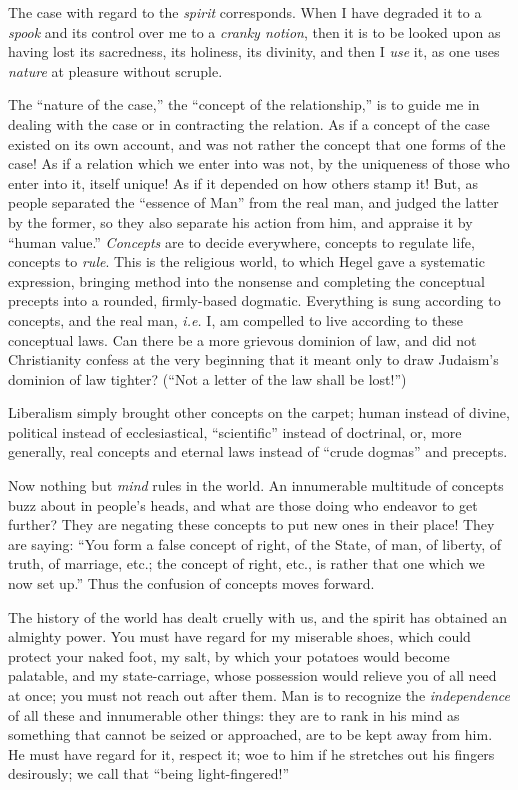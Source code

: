 \documentclass[12pt,a4paper]{book}
\begin{document}
The case with regard to the \textit{spirit} corresponds. When I have degraded 
it to a \textit{spook} and its control over me to a \textit{cranky notion}, 
then it is to be looked upon as having lost its sacredness, its holiness, its 
divinity, and then I \textit{use} it, as one uses \textit{nature} at pleasure 
without scruple.

The ``nature of the case,'' the ``concept of the relationship,'' is to 
guide me in dealing with the case or in contracting the relation. As if a 
concept of the case existed on its own account, and was not rather the concept 
that one forms of the case! As if a relation which we enter into was not, by 
the uniqueness of those who enter into it, itself unique! As if it depended on 
how others stamp it! But, as people separated the ``essence of Man'' from 
the real man, and judged the latter by the former, so they also separate his 
action from him, and appraise it by ``human value.'' \textit{Concepts} are 
to decide everywhere, concepts to regulate life, concepts to \textit{rule}. 
This is the religious world, to which Hegel gave a systematic expression, 
bringing method into the nonsense and completing the conceptual precepts into 
a rounded, firmly-based dogmatic. Everything is sung according to concepts, 
and the real man, \textit{i.e.} I, am compelled to live according to these 
conceptual laws. Can there be a more grievous dominion of law, and did not 
Christianity confess at the very beginning that it meant only to draw 
Judaism's dominion of law tighter? (``Not a letter of the law shall be 
lost!'')

Liberalism simply brought other concepts on the carpet; human instead of 
divine, political instead of ecclesiastical, ``scientific'' instead of 
doctrinal, or, more generally, real concepts and eternal laws instead of 
``crude dogmas'' and precepts.

Now nothing but \textit{mind} rules in the world. An innumerable multitude of 
concepts buzz about in people's heads, and what are those doing who endeavor 
to get further? They are negating these concepts to put new ones in their 
place! They are saying: ``You form a false concept of right, of the State, of 
man, of liberty, of truth, of marriage, etc.; the concept of right, etc., is 
rather that one which we now set up.'' Thus the confusion of concepts moves 
forward.

The history of the world has dealt cruelly with us, and the spirit has 
obtained an almighty power. You must have regard for my miserable shoes, which 
could protect your naked foot, my salt, by which your potatoes would become 
palatable, and my state-carriage, whose possession would relieve you of all 
need at once; you must not reach out after them. Man is to recognize the 
\textit{independence} of all these and innumerable other things: they are to 
rank in his mind as something that cannot be seized or approached, are to be 
kept away from him. He must have regard for it, respect it; woe to him if he 
stretches out his fingers desirously; we call that ``being light-fingered!''
\end{document}

